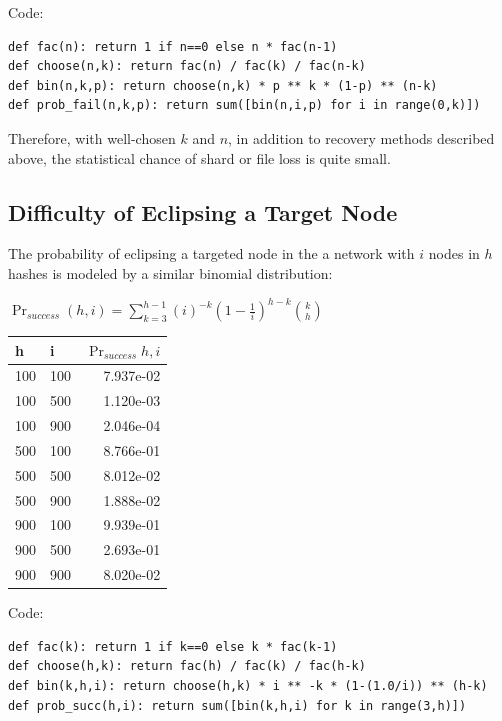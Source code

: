 \documentclass[a4paper,10pt]{article}
\begin{document}
Code:
\begin{lstlisting}
def fac(n): return 1 if n==0 else n * fac(n-1)
def choose(n,k): return fac(n) / fac(k) / fac(n-k)
def bin(n,k,p): return choose(n,k) * p ** k * (1-p) ** (n-k)
def prob_fail(n,k,p): return sum([bin(n,i,p) for i in range(0,k)])
\end{lstlisting}

Therefore, with well-chosen $ k $ and $ n $, in addition to recovery methods described above, the statistical chance of shard or file loss is quite small.

\subsection{Difficulty of Eclipsing a Target Node}
The probability of eclipsing a targeted node in the a network with $ i $ nodes in $ h $ hashes is modeled by a similar binomial distribution:

{\centering
$\Pr_{success}(h, i) = \displaystyle \sum_{k=3}^{h-1} (i)^{-k}(1-\frac{1}{i})^{h-k}{k \choose h}$
\\}

\begin{table}[hbt!]
\begin{center}
\begin{tabular}{l l r}
h & i & $\Pr_{success}{h,i}$\\
\hline  100 & 100 & 7.937e-02\\
\hline  100 & 500 & 1.120e-03\\
\hline  100 & 900 & 2.046e-04\\
\hline  500 & 100 & 8.766e-01\\
\hline  500 & 500 & 8.012e-02\\
\hline  500 & 900 & 1.888e-02\\
\hline  900 & 100 & 9.939e-01\\
\hline  900 & 500 & 2.693e-01\\
\hline  900 & 900 & 8.020e-02\\
\end{tabular}
\end{center}
\end{table}

Code:
\begin{lstlisting}
def fac(k): return 1 if k==0 else k * fac(k-1)
def choose(h,k): return fac(h) / fac(k) / fac(h-k)
def bin(k,h,i): return choose(h,k) * i ** -k * (1-(1.0/i)) ** (h-k)
def prob_succ(h,i): return sum([bin(k,h,i) for k in range(3,h)])
\end{lstlisting}
\end{document}
